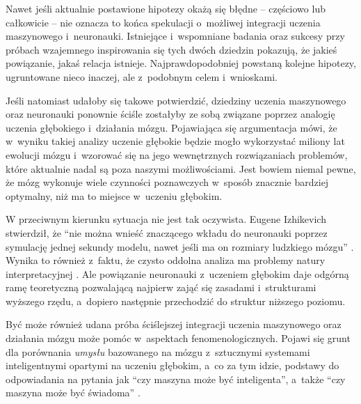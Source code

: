 Nawet jeśli aktualnie postawione hipotezy okażą się błędne -- częściowo lub całkowicie -- nie oznacza to końca spekulacji o~możliwej integracji uczenia maszynowego i~neuronauki.
Istniejące i~wspomniane badania oraz sukcesy przy próbach wzajemnego inspirowania się tych dwóch dziedzin pokazują, że jakieś powiązanie, jakaś relacja istnieje.
Najprawdopodobniej powstaną kolejne hipotezy, ugruntowane nieco inaczej, ale z~podobnym celem i~wnioskami.

Jeśli natomiast udałoby się takowe potwierdzić, dziedziny uczenia maszynowego oraz neuronauki ponownie ściśle zostałyby ze sobą związane poprzez analogię uczenia głębokiego i~działania mózgu.
Pojawiająca się argumentacja mówi, że w~wyniku takiej analizy uczenie głębokie będzie mogło wykorzystać miliony lat ewolucji mózgu i~wzorować się na jego wewnętrznych rozwiązaniach problemów, które aktualnie nadal są poza naszymi możliwościami.
Jest bowiem niemal pewne, że mózg wykonuje wiele czynności poznawczych w~sposób znacznie bardziej optymalny, niż ma to miejsce w~uczeniu głębokim.

W przeciwnym kierunku sytuacja nie jest tak oczywista.
Eugene Izhikevich stwierdził, że ``nie można wnieść znaczącego wkładu do neuronauki poprzez symulację jednej sekundy modelu, nawet jeśli ma on rozmiary ludzkiego mózgu'' \cite{Izhikevich2006why}.
Wynika to również z~faktu, że czysto oddolna analiza ma problemy natury interpretacyjnej \cite{jonas2017could}.
Ale powiązanie neuronauki z~uczeniem głębokim daje odgórną ramę teoretyczną pozwalającą najpierw zająć się zasadami i~strukturami wyższego rzędu, a~dopiero następnie przechodzić do struktur niższego poziomu.

Być może również udana próba ściślejszej integracji uczenia maszynowego oraz działania mózgu może pomóc w~aspektach fenomenologicznych.
Pojawi się grunt dla porównania \emph{umysłu} bazowanego na mózgu z~sztucznymi systemami inteligentnymi opartymi na uczeniu głębokim, a~co za tym idzie, podstawy do odpowiadania na pytania jak ``czy maszyna może być inteligenta'', a~także ``czy maszyna może być świadoma'' \cite{mallakin2019integration}.
